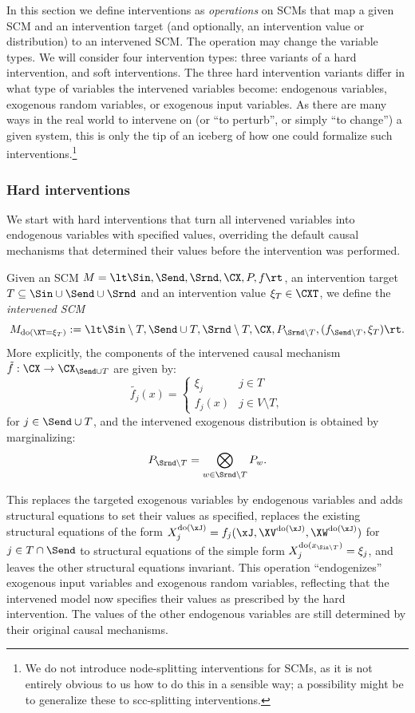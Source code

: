 In this section we define interventions as \emph{operations} on SCMs that map a given SCM and an intervention target (and optionally, an intervention value or distribution) to an intervened SCM. 
The operation may change the variable types. 
We will consider four intervention types: three variants of a hard intervention, and soft interventions. 
The three hard intervention variants differ in what type of variables the intervened variables become: endogenous variables, exogenous random variables, or exogenous input variables.
As there are many ways in the real world to intervene on (or ``to perturb'', or simply ``to change'') a given system, this is only the tip of an iceberg of how one could formalize such interventions.\footnote{We do not introduce node-splitting interventions for SCMs, as it is not entirely obvious to us how to do this in a sensible way; a possibility might be to generalize these to scc-splitting interventions.}

\subsubsection{Hard interventions}

We start with hard interventions that turn all intervened variables into
endogenous variables with specified values, overriding
the default causal mechanisms that determined their values before the
intervention was performed.
\begin{Def}\label{def:scm_hard_intervention}
  Given an SCM $M = \lt \Sin, \Send, \Srnd, \CX, P, f \rt$, an intervention target $T \subseteq \Sin \cup \Send \cup \Srnd$ 
  and an intervention value $\xi_T \in \CXT$, we define the \emph{intervened SCM}
  $$M_{\doit(\XT=\xi_T)} := \lt \Sin\setminus T,\Send \cup T,\Srnd \setminus T,\CX,P_{\Srnd\setminus T},(f_{\Send\setminus T},\xi_T) \rt.$$
  More explicitly, the components of the intervened causal mechanism $\tilde{f} : \CX \to \CX_{\Send \cup T}$ are
  given by:
    $$\tilde{f_j}(x) = \begin{cases}
      \xi_j & j \in T \\
        f_j(x) & j \in V \setminus T,
    \end{cases}$$
  for $j \in \Send \cup T$, and the intervened exogenous distribution is obtained by marginalizing:
  $$P_{\Srnd\setminus T} = \bigotimes_{w\in\Srnd\setminus T} P_w.$$
\end{Def}
This replaces the targeted exogenous variables by endogenous variables and adds structural equations
to set their values as specified, replaces the existing structural equations of the form
$X_j^{\doit(\xJ)} = f_j(\xJ,\XV^{\doit(\xJ)},\XW^{\doit(\xJ)})$ for $j \in T \cap \Send$ to structural equations of the simple form 
$X_j^{\doit(x_{\Sin\setminus T})} = \xi_j$, and leaves the other structural equations invariant.
This operation ``endogenizes'' exogenous input variables and exogenous random variables,
reflecting that the intervened model now specifies their values as prescribed by the hard intervention.
The values of the other endogenous variables are still determined by their original causal mechanisms.

